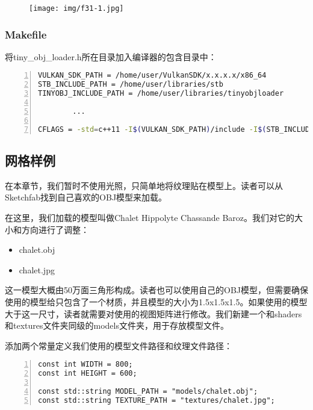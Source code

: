\documentclass{ctexart}
\begin{document}
\begin{figure}[H]
	\centering
	\texttt{[image: img/f31-1.jpg]}
\end{figure}

\subsubsection{Makefile}

将tiny\_obj\_loader.h所在目录加入编译器的包含目录中：

\begin{lstlisting}[language={bash},keywordstyle=\color{blue!70},commentstyle=\color{red!50!green!50!blue!50},frame=shadowbox, rulesepcolor=\color{red!20!green!20!blue!20},basicstyle=\small,numbers=left, numberstyle=\tiny,breaklines=true]
VULKAN_SDK_PATH = /home/user/VulkanSDK/x.x.x.x/x86_64
STB_INCLUDE_PATH = /home/user/libraries/stb
TINYOBJ_INCLUDE_PATH = /home/user/libraries/tinyobjloader

		...

CFLAGS = -std=c++11 -I$(VULKAN_SDK_PATH)/include -I$(STB_INCLUDE_PATH) -I$(TINYOBJ_INCLUDE_PATH)
\end{lstlisting}

\subsection{网格样例}

在本章节，我们暂时不使用光照，只简单地将纹理贴在模型上。读者可以从Sketchfab找到自己喜欢的OBJ模型来加载。

在这里，我们加载的模型叫做Chalet Hippolyte Chassande Baroz。我们对它的大小和方向进行了调整：

\begin{itemize}
	\item chalet.obj
	\item chalet.jpg
\end{itemize}

这一模型大概由50万面三角形构成。读者也可以使用自己的OBJ模型，但需要确保使用的模型给只包含了一个材质，并且模型的大小为1.5x1.5x1.5。如果使用的模型大于这一尺寸，读者就需要对使用的视图矩阵进行修改。我们新建一个和shaders和textures文件夹同级的models文件夹，用于存放模型文件。

添加两个常量定义我们使用的模型文件路径和纹理文件路径：

\begin{lstlisting}[language={[ANSI]C},keywordstyle=\color{blue!70},commentstyle=\color{red!50!green!50!blue!50},frame=shadowbox, rulesepcolor=\color{red!20!green!20!blue!20},basicstyle=\small,numbers=left, numberstyle=\tiny,breaklines=true]
const int WIDTH = 800;
const int HEIGHT = 600;

const std::string MODEL_PATH = "models/chalet.obj";
const std::string TEXTURE_PATH = "textures/chalet.jpg";
\end{lstlisting}
\end{document}
